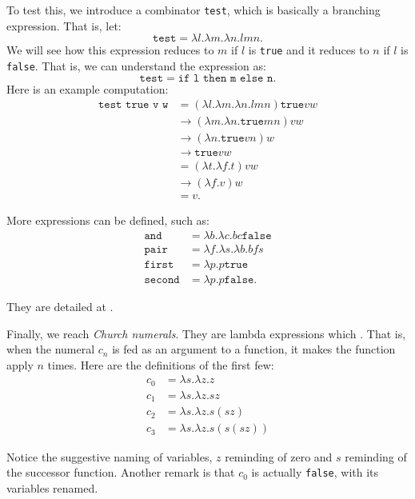 To test this, we introduce a combinator \texttt{test}, which
is basically a branching expression. That is, let:
\[
  \texttt{test} = \lambda l . \lambda m . \lambda n . lmn.
\]
We will see how this expression reduces to $ m $ if $ l $ is
\texttt{true} and it reduces to $ n $ if $ l $ is \texttt{false}.
That is, we can understand the expression as:
\[
  \texttt{test} = \texttt{if l then m else n}.
\]
Here is an example computation:
\begin{align*}
  \texttt{test true v w} &= (\lambda l . \lambda m . \lambda n . lmn) \texttt{true} v w \\
                         &\to (\lambda m . \lambda n . \texttt{true} m n) v w \\
                         &\to (\lambda n . \texttt{true} v n) w \\
                         &\to \texttt{true} v w \\
                         &= (\lambda t . \lambda f . t) vw \\
                         &\to (\lambda f . v) w \\
                         &= v.
\end{align*}

More expressions can be defined, such as:
\begin{align*}
  \texttt{and} &= \lambda b . \lambda c . bc \texttt{false} \\
  \texttt{pair} &= \lambda f . \lambda s . \lambda b . bfs \\
  \texttt{first} &= \lambda p . p \texttt{true} \\
  \texttt{second} &= \lambda p . p \texttt{false}.
\end{align*}

They are detailed at \cite[pp. 59-60]{tapl}.

Finally, we reach \emph{Church numerals}. They are lambda expressions
which . That is, when the numeral $ c_n $ is fed
as an argument to a function, it makes the function apply $ n $ times.
Here are the definitions of the first few:
\begin{align*}
  c_0 &= \lambda s . \lambda z . z \\
  c_1 &= \lambda s . \lambda z . s z \\
  c_2 &= \lambda s . \lambda z . s (s z) \\
  c_3 &= \lambda s . \lambda z . s (s (s z))
\end{align*}

Notice the suggestive naming of variables, $ z $ reminding of zero
and $ s $ reminding of the successor function. Another remark is that
$ c_0 $ is actually \texttt{false}, with its variables renamed.

